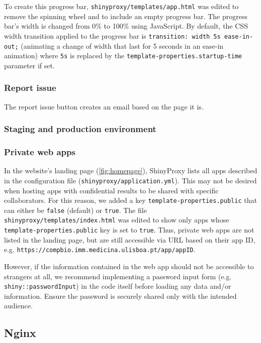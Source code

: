 To create this progress bar, \verb|shinyproxy/templates/app.html| was edited to remove the spinning wheel and to include an empty progress bar. The progress bar's width is changed from 0\% to 100\% using JavaScript. By default, the CSS width transition applied to the progress bar is \texttt{transition: width 5s ease-in-out;} (animating a change of width that last for 5 seconds in an ease-in animation) where \texttt{5s} is replaced by the \texttt{template-properties.startup-time} parameter if set.

\subsubsection{Report issue}

The report issue button creates an email based on the page it is.

\subsubsection{Staging and production environment}

\subsubsection{Private web apps}

In the website's landing page (\autoref{fig:homepage}), ShinyProxy lists all apps described in the configuration file (\texttt{shinyproxy/application.yml}). This may not be desired when hosting apps with confidential results to be shared with specific collaborators. For this reason, we added a key \texttt{template-properties.public} that can either be \texttt{false} (default) or \texttt{true}. The file \texttt{shinyproxy/templates/index.html} was edited to show only apps whose \texttt{template-properties.public} key is set to \texttt{true}. Thus, private web apps are not listed in the landing page, but are still accessible via URL based on their app ID, e.g. \texttt{https://compbio.imm.medicina.ulisboa.pt/app/appID}.

However, if the information contained in the web app should not be accessible to strangers at all, we recommend implementing a password input form (e.g. \texttt{shiny::passwordInput}) in the code itself before loading any data and/or information. Ensure the password is securely shared only with the intended audience.

\subsection{Nginx}

